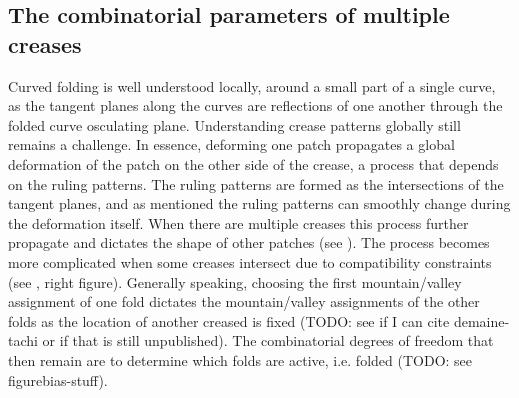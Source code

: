 
\subsection{The combinatorial parameters of multiple creases}
Curved folding is well understood locally, around a small part of a single curve, as the tangent planes along the curves are reflections of one another through the folded curve osculating plane. Understanding crease patterns globally still remains a challenge. In essence, deforming one patch propagates a global deformation of the patch on the other side of the crease, a process that depends on the ruling patterns. The ruling patterns are formed as the intersections of the tangent planes, and as mentioned the ruling patterns can smoothly change during the deformation itself. When there are multiple creases this process further propagate and dictates the shape of other patches (see ). The process becomes more complicated when some creases intersect due to compatibility constraints (see , right figure). Generally speaking, choosing the first mountain/valley assignment of one fold dictates the mountain/valley assignments of the other folds as the location of another creased is fixed (TODO: see if I can cite demaine-tachi or if that is still unpublished). The combinatorial degrees of freedom that then remain are to determine which folds are active, i.e. folded (TODO: see figurebias-stuff).


